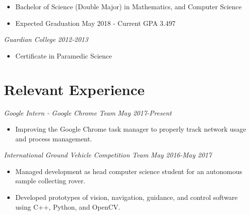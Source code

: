 \documentclass[letterpaper]{article}
\begin{document}
\begin{itemize}
\item Bachelor of Science (Double Major) in  Mathematics, and Computer Science


\item Expected Graduation May 2018 - Current GPA 3.497
\end{itemize}

\vspace{.05in}
\begin{multicols}{2}
\textit{Guardian College}
\vfill
\columnbreak
\textit{2012-2013}
\end{multicols}
\begin{itemize}
      \item Certificate in Paramedic Science 
\end{itemize}
\section*{Relevant Experience}

\begin{multicols}{2}
\textit{Google Intern - Google Chrome Team}
\vfill
\columnbreak
\textit{May 2017-Present}
\end{multicols}
\begin{itemize}
    \item Improving the Google Chrome task manager to properly track network usage and process management.
\end{itemize}

\vspace{.05in}


\begin{multicols}{2}
\textit{International Ground Vehicle Competition Team}
\vfill
\columnbreak
\textit{May 2016-May 2017}
\end{multicols}
\begin{itemize}
    \item Managed development as head computer science student for an autonomous sample collecting rover.
    \item Developed prototypes of vision, navigation, guidance, and control software using C++, Python, and OpenCV. 
\end{itemize}
\end{document}
